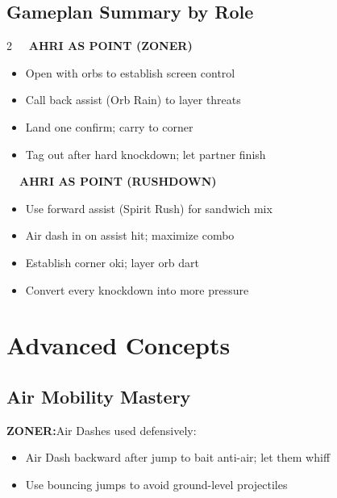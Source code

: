 \documentclass[12pt, a4paper]{report}
\newcommand{\faFistRaised}{\ding{108}}
\newcommand{\faBookOpen}{\ding{70}}
\newcommand{\zoner}{\textcolor{ahriCyan}{\bfseries\sffamily{\small $\blacktriangleright$} ZONER:}\;}
\begin{document}
\section{Gameplan Summary by Role}

\begin{tcolorbox}[colback=sectionbg,colframe=ahriBlue!60,arc=5pt,boxrule=0.8pt,left=8pt,right=8pt,top=8pt,bottom=8pt]
\begin{multicols}{2}
\textcolor{ahriCyan}{\bfseries\sffamily\faBookOpen\ \ AHRI AS POINT (ZONER)}\\[4pt]
\begin{itemize}[leftmargin=*]
  \item Open with orbs to establish screen control
  \item Call back assist (Orb Rain) to layer threats
  \item Land one confirm; carry to corner
  \item Tag out after hard knockdown; let partner finish
\end{itemize}
\columnbreak
\textcolor{ahriMagenta}{\bfseries\sffamily\faFistRaised\ \ AHRI AS POINT (RUSHDOWN)}\\[4pt]
\begin{itemize}[leftmargin=*]
  \item Use forward assist (Spirit Rush) for sandwich mix
  \item Air dash in on assist hit; maximize combo
  \item Establish corner oki; layer orb dart
  \item Convert every knockdown into more pressure
\end{itemize}
\end{multicols}
\end{tcolorbox}

\clearpage

\chapter{Advanced Concepts}

\section{Air Mobility Mastery}

\zoner Air Dashes used defensively:
\begin{itemize}
  \item Air Dash backward after jump to bait anti-air; let them whiff
  \item Use bouncing jumps to avoid ground-level projectiles
\end{itemize}
\end{document}
